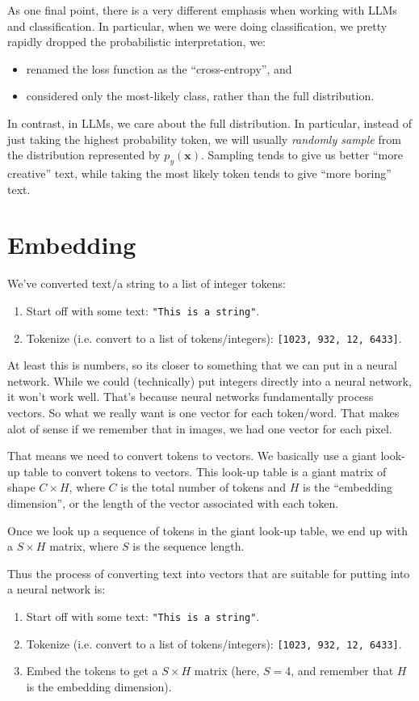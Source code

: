 \documentclass{article}
\newcommand{\x}{\mathbf{x}}
\begin{document}
As one final point, there is a very different emphasis when working with LLMs and classification.  In particular, when we were doing classification, we pretty rapidly dropped the probabilistic interpretation, we:
\begin{itemize}
  \item renamed the loss function as the ``cross-entropy'', and
  \item considered only the most-likely class, rather than the full distribution.
\end{itemize}
In contrast, in LLMs, we care about the full distribution.
In particular, instead of just taking the highest probability token, we will usually \textit{randomly sample} from the distribution represented by $p_y(\x)$.
Sampling tends to give us better ``more creative'' text, while taking the most likely token tends to give ``more boring'' text.


\section{Embedding}

We've converted text/a string to a list of integer tokens:
\begin{enumerate}
  \item Start off with some text: \verb|"This is a string"|.
  \item Tokenize (i.e. convert to a list of tokens/integers): \verb|[1023, 932, 12, 6433]|.
\end{enumerate}
At least this is numbers, so its closer to something that we can put in a neural network.
While we could (technically) put integers directly into a neural network, it won't work well.
That's because neural networks fundamentally process vectors.
So what we really want is one vector for each token/word.
That makes alot of sense if we remember that in images, we had one vector for each pixel.

That means we need to convert tokens to vectors.
We basically use a giant look-up table to convert tokens to vectors.
This look-up table is a giant matrix of shape $C \times H$, where $C$ is the total number of tokens and $H$ is the ``embedding dimension'', or the length of the vector associated with each token.
 
Once we look up a sequence of tokens in the giant look-up table, we end up with a $S \times H$ matrix, where $S$ is the sequence length.

Thus the process of converting text into vectors that are suitable for putting into a neural network is:
\begin{enumerate}
  \item Start off with some text: \verb|"This is a string"|.
  \item Tokenize (i.e. convert to a list of tokens/integers): \verb|[1023, 932, 12, 6433]|.
  \item Embed the tokens to get a $S\times H$ matrix (here, $S = 4$, and remember that $H$ is the embedding dimension).
\end{enumerate}
\end{document}

